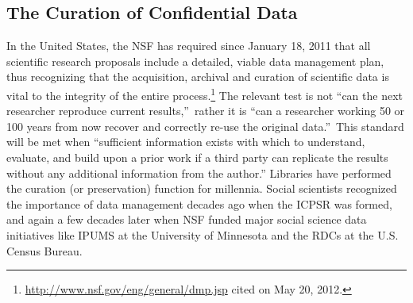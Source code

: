                       

%

\subsection{The Curation of Confidential Data}

In the United States, the \acf{NSF} has required since January 18, 2011 that
all scientific research proposals include a detailed, viable data management
plan, thus recognizing that the acquisition, archival and curation of
scientific data is vital to the integrity of the entire process.\footnote{%
\href{http://www.nsf.gov/eng/general/dmp.jsp}{%
http://www.nsf.gov/eng/general/dmp.jsp} cited on May 20, 2012.} The relevant
test is not \textquotedblleft can the next researcher reproduce current
results,\textquotedblright\ rather it is \textquotedblleft can a researcher
working 50 or 100 years from now recover and correctly re-use the original
data.\textquotedblright\ This standard will be met when ``sufficient information exists with which to understand, evaluate, and build upon a prior work if a third party can replicate the results without any additional information from the author.''  \cite{King1995} 
Libraries have performed the curation (or
preservation) function for millennia. Social scientists recognized the
importance of data management decades ago when the \acf{ICPSR} was formed,
and again a few decades later when \ac{NSF} funded major social science data
initiatives like \ac{IPUMS} at the University of Minnesota and the \acp{RDC}
at the U.S. Census Bureau.

